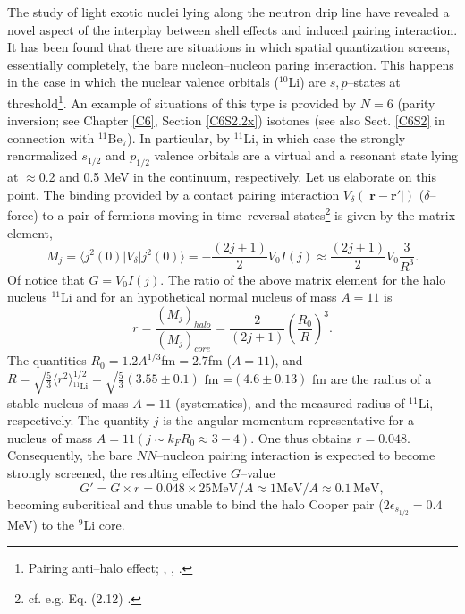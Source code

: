 The study of light exotic nuclei lying along the neutron drip line have revealed a novel aspect of the interplay between shell effects and induced pairing interaction. It has been found  that there are situations in which spatial quantization screens, essentially completely, the bare nucleon--nucleon paring interaction. This happens in the case in which the nuclear valence orbitals ($^{10}$Li) are $s,p$--states at threshold\footnote{Pairing anti--halo effect; \cite{Bennaceur:00} 
, \cite{Hamamoto:03}, \cite{Hamamoto:04}.}. An example of situations of this type is provided by $N=6$ (parity inversion; see Chapter \ref{C6}, Section \ref{C6S2.2x}) isotones (see also Sect. \ref{C6S2} in connection with $^{11}$Be$_7$). In particular, by $^{11}$Li, in which case the strongly renormalized $s_{1/2}$ and $p_{1/2}$ valence orbitals are a virtual and a resonant state lying at $\approx$0.2 and 0.5 MeV in the continuum, respectively. Let us elaborate on this point. 
The binding provided by a contact pairing interaction $V_\delta (|\mathbf{r}-\mathbf{r}'|)$ ($\delta$--force) to a pair of fermions moving in time--reversal states\footnote{cf. e.g. Eq. (2.12) \cite{Brink:05}.} is given by the matrix element,
\begin{equation*}
M_j=\langle j^2(0)|V_\delta|j^2(0)\rangle=-\frac{(2j+1)}{2} V_0 I(j)\approx \frac{(2j+1)}{2}V_0\frac{3}{R^3}.
\end{equation*} 
Of notice that $G=V_0I(j)$. 
The ratio of the above matrix element for the halo nucleus $^{11}$Li and for an hypothetical normal nucleus of mass $A=11$ is
\begin{equation*}
r=\frac{(M_j)_{halo}}{(M_j)_{core}}=\frac{2}{(2j+1)}\left(\frac{R_0}{R}\right)^3.
\end{equation*}
The quantities $R_0=1.2 A^{1/3}$fm$=2.7$fm ($A=11$), and $R=\sqrt{\frac{5}{3}}\langle r^2\rangle^{1/2}_{^{11}\text{Li}}=\sqrt{\frac{5}{3}}(3.55\pm0.1)$ fm =$(4.6\pm 0.13)$ fm are the radius of a stable nucleus of mass $A=11$ (systematics), and  the measured radius of $^{11}$Li, respectively. The quantity $j$ is the angular momentum representative for a nucleus of mass $A=11 (j\sim k_F R_0\approx 3-4)$. One thus obtains $r=0.048$. Consequently, the bare $NN$--nucleon pairing interaction is expected to become strongly screened, the resulting effective $G$--value 
\begin{equation}\label{eq1C2AppF}
G'=G\times r=0.048\times 25 \text{MeV}/A\approx 1 \text{MeV}/A\approx 0.1\,\text{MeV},
\end{equation}
becoming subcritical and thus unable to bind the halo Cooper pair ($2\epsilon_{s_{1/2}}=0.4$ MeV) to the $^9$Li core.


